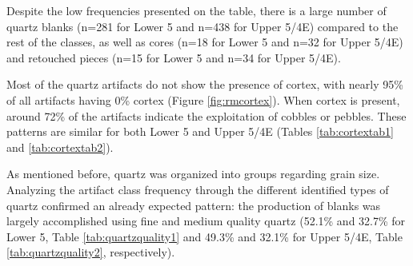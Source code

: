 \documentclass[12pt,twoside]{reedthesis}
\begin{document}
Despite the low frequencies presented on the table, there is a large number of quartz blanks (n=281 for Lower 5 and n=438 for Upper 5/4E) compared to the rest of the classes, as well as cores (n=18 for Lower 5 and n=32 for Upper 5/4E) and retouched pieces (n=15 for Lower 5 and n=34 for Upper 5/4E).

Most of the quartz artifacts do not show the presence of cortex, with nearly 95\% of all artifacts having 0\% cortex (Figure \ref{fig:rmcortex}). When cortex is present, around 72\% of the artifacts indicate the exploitation of cobbles or pebbles. These patterns are similar for both Lower 5 and Upper 5/4E (Tables \ref{tab:cortextab1} and \ref{tab:cortextab2}).

As mentioned before, quartz was organized into groups regarding grain size. Analyzing the artifact class frequency through the different identified types of quartz confirmed an already expected pattern: the production of blanks was largely accomplished using fine and medium quality quartz (52.1\% and 32.7\% for Lower 5, Table \ref{tab:quartzquality1} and 49.3\% and 32.1\% for Upper 5/4E, Table \ref{tab:quartzquality2}, respectively).
\end{document}
